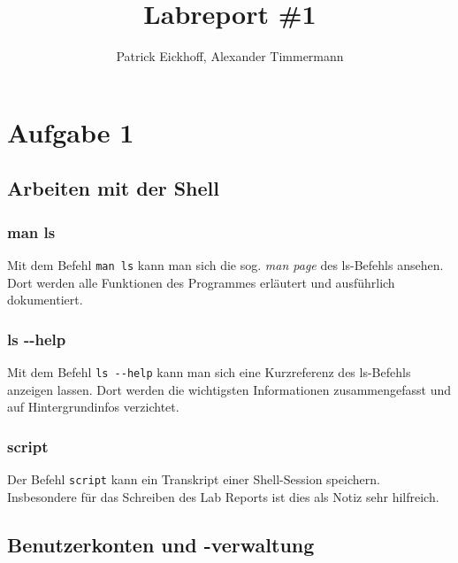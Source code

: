 \documentclass{scrartcl}
\author{Patrick Eickhoff, Alexander Timmermann}
\title{Labreport \#1}
\date{}
\begin{document}
    \maketitle
    \section*{Aufgabe 1}
    \label{sec:Aufgabe 1}

    \subsection{Arbeiten mit der Shell}
    \label{sub:Arbeiten mit der Shell}

    \subsubsection{man ls}
    \label{subs:man ls}
        Mit dem Befehl \texttt{man ls} kann man sich die sog. \textit{man page}
        des ls-Befehls ansehen. Dort werden alle Funktionen des Programmes erläutert
        und ausführlich dokumentiert.

    \subsubsection{ls \--\--help}
    \label{subs:ls --help}
        Mit dem Befehl \texttt{ls \--\--help} kann man sich eine Kurzreferenz des
        ls-Befehls anzeigen lassen. Dort werden die wichtigsten Informationen
        zusammengefasst und auf Hintergrundinfos verzichtet.

    \subsubsection{script}
    \label{subs:script}
        Der Befehl \texttt{script} kann ein Transkript einer Shell-Session
        speichern. Insbesondere für das Schreiben des Lab Reports ist dies
        als Notiz sehr hilfreich.

    \subsection{Benutzerkonten und -verwaltung}
    \label{sub:Benutzerkonten und -verwaltung}
\end{document}
